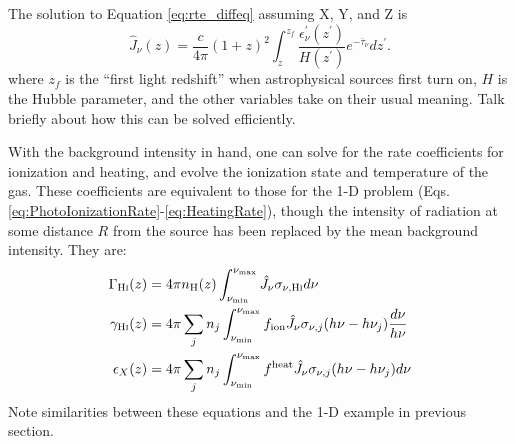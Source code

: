 The solution to Equation \ref{eq:rte_diffeq} {\color{red} assuming X, Y, and Z} is
\begin{equation}
    \hat{J}_{\nu} (z) = \frac{c}{4\pi} (1 + z)^2 \int_{z}^{z_f} \frac{\epsilon_{\nu}^{\prime}(z^{\prime})}{H(z^{\prime})} e^{-\overline{\tau}_{\nu}} dz^{\prime} . \label{eq:AngleAveragedFlux}
\end{equation}    
where $z_f$ is the ``first light redshift'' when astrophysical sources first turn on, $H$ is the Hubble parameter, and the other variables take on their usual meaning. {\color{red} Talk briefly about how this can be solved efficiently.}

With the background intensity in hand, one can solve for the rate coefficients for ionization and heating, and evolve the ionization state and temperature of the gas.  These coefficients are equivalent to those for the 1-D problem (Eqs. \ref{eq:PhotoIonizationRate}-\ref{eq:HeatingRate}), though the intensity of radiation at some distance $R$ from the source has been replaced by the mean background intensity. They are:
\begin{align}
    \Gamma_{\text{H} {\textsc{i}}}(z) & = 4 \pi n_{\text{H}}(z) \int_{\nu_{\min}}^{\nu_{\max}} \hat{J}_{\nu} \sigma_{\nu,\text{H} {\textsc{i}}} d\nu  \\
    \gamma_{\text{H} {\textsc{i}}}(z) & = 4 \pi \sum_j n_j \int_{\nu_{\min}}^{\nu_{\max}} f_{\text{ion}} \hat{J}_{\nu} \sigma_{\nu,j} (h\nu - h\nu_j) \frac{d\nu}{h\nu}  \\
    \epsilon_X(z) & = 4 \pi \sum_j n_j \int_{\nu_{\min}}^{\nu_{\max}} f^{\text{heat}} \hat{J}_{\nu}  \sigma_{\nu,j} (h\nu - h\nu_j) d\nu
\end{align}
{\color{red} Note similarities between these equations and the 1-D example in previous section.}

